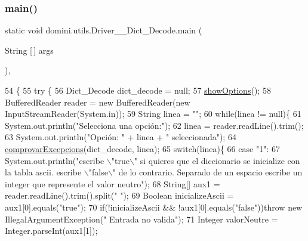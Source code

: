 \subsubsection{\texorpdfstring{main()}{main()}}
{\footnotesize\ttfamily static void domini.\+utils.\+Driver\+\_\+\+\_\+\+Dict\+\_\+\+Decode.\+main (\begin{DoxyParamCaption}\item[{String \mbox{[}$\,$\mbox{]}}]{args }\end{DoxyParamCaption})\hspace{0.3cm}{\ttfamily [inline]}, {\ttfamily [static]}}


\begin{DoxyCode}
54                                            \{
55     \textcolor{keywordflow}{try} \{
56         Dict\_Decode dict\_decode = null;
57         \hyperlink{classdomini_1_1utils_1_1Driver____Dict__Decode_af3ae63bfc55ea99e468d6c9c86ec26c9}{showOptions}();
58         BufferedReader reader = \textcolor{keyword}{new} BufferedReader(\textcolor{keyword}{new} InputStreamReader(System.in));
59         String linea = \textcolor{stringliteral}{""};
60         \textcolor{keywordflow}{while}(linea != null)\{
61             System.out.println(\textcolor{stringliteral}{"Selecciona una opción:"});
62             linea = reader.readLine().trim();
63             System.out.println(\textcolor{stringliteral}{"Opción: "} + linea + \textcolor{stringliteral}{" seleccionada"});
64             \hyperlink{classdomini_1_1utils_1_1Driver____Dict__Decode_a41ddfd0f1473de9401aa7860cff2f3e8}{comprovarExcepcions}(dict\_decode, linea);
65             \textcolor{keywordflow}{switch}(linea)\{
66                 \textcolor{keywordflow}{case} \textcolor{stringliteral}{"1"}:
67                     System.out.println(\textcolor{stringliteral}{"escribe \(\backslash\)"true\(\backslash\)" si quieres que el diccionario se inicialize con la
       tabla ascii. escribe \(\backslash\)"false\(\backslash\)" de lo contrario. Separado de un espacio escribe un integer que represente el
       valor neutro"});
68                     String[] aux1 = reader.readLine().trim().split(\textcolor{stringliteral}{" "});
69                     Boolean inicializeAscii = aux1[0].equals(\textcolor{stringliteral}{"true"});
70                     \textcolor{keywordflow}{if}(!inicializeAscii && !aux1[0].equals(\textcolor{stringliteral}{"false"}))\textcolor{keywordflow}{throw} \textcolor{keyword}{new} IllegalArgumentException(\textcolor{stringliteral}{"
      Entrada no valida"});
71                     Integer valorNeutre = Integer.parseInt(aux1[1]);

\end{DoxyCode}
